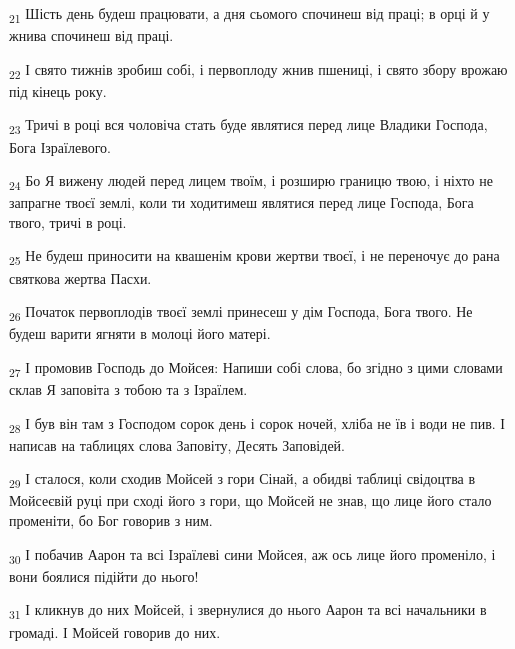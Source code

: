 \begin{tcolorbox}
\textsubscript{21} Шість день будеш працювати, а дня сьомого спочинеш від праці; в орці й у жнива спочинеш від праці.
\end{tcolorbox}
\begin{tcolorbox}
\textsubscript{22} І свято тижнів зробиш собі, і первоплоду жнив пшениці, і свято збору врожаю під кінець року.
\end{tcolorbox}
\begin{tcolorbox}
\textsubscript{23} Тричі в році вся чоловіча стать буде являтися перед лице Владики Господа, Бога Ізраїлевого.
\end{tcolorbox}
\begin{tcolorbox}
\textsubscript{24} Бо Я вижену людей перед лицем твоїм, і розширю границю твою, і ніхто не запрагне твоєї землі, коли ти ходитимеш являтися перед лице Господа, Бога твого, тричі в році.
\end{tcolorbox}
\begin{tcolorbox}
\textsubscript{25} Не будеш приносити на квашенім крови жертви твоєї, і не переночує до рана святкова жертва Пасхи.
\end{tcolorbox}
\begin{tcolorbox}
\textsubscript{26} Початок первоплодів твоєї землі принесеш у дім Господа, Бога твого. Не будеш варити ягняти в молоці його матері.
\end{tcolorbox}
\begin{tcolorbox}
\textsubscript{27} І промовив Господь до Мойсея: Напиши собі слова, бо згідно з цими словами склав Я заповіта з тобою та з Ізраїлем.
\end{tcolorbox}
\begin{tcolorbox}
\textsubscript{28} І був він там з Господом сорок день і сорок ночей, хліба не їв і води не пив. І написав на таблицях слова Заповіту, Десять Заповідей.
\end{tcolorbox}
\begin{tcolorbox}
\textsubscript{29} І сталося, коли сходив Мойсей з гори Сінай, а обидві таблиці свідоцтва в Мойсеєвій руці при сході його з гори, що Мойсей не знав, що лице його стало променіти, бо Бог говорив з ним.
\end{tcolorbox}
\begin{tcolorbox}
\textsubscript{30} І побачив Аарон та всі Ізраїлеві сини Мойсея, аж ось лице його променіло, і вони боялися підійти до нього!
\end{tcolorbox}
\begin{tcolorbox}
\textsubscript{31} І кликнув до них Мойсей, і звернулися до нього Аарон та всі начальники в громаді. І Мойсей говорив до них.
\end{tcolorbox}
